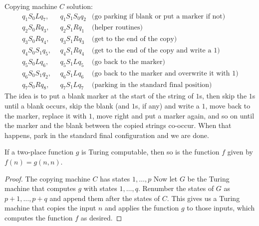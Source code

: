 \begin{exercise}[4.3]
  Copying machine $C$ solution:
  \begin{align*}
    q_1S_0Lq_7,&~~q_1S_1S_0q_2&\text{(go parking if blank or put a marker if not)}\\
    q_2S_0Rq_3,&~~q_2S_1Rq_1&\text{(helper routines)}\\
    q_3S_0Rq_4,&~~q_3S_1Rq_3&\text{(get to the end of the copy)}\\
    q_4S_0S_1q_5,&~~q_4S_1Rq_4&\text{(get to the end of the copy and write a $1$)}\\
    q_5S_0Lq_6,&~~q_5S_1Lq_5&\text{(go back to the marker)}\\
    q_6S_0S_1q_2,&~~q_6S_1Lq_6&\text{(go back to the marker and overwrite it with $1$)}\\
    q_7S_0Rq_8,&~~q_7S_1Lq_7&\text{(parking in the standard final position)}
  \end{align*}
  The idea is to put a blank marker at the start of the string of $1$s, then skip the $1$s until a blank occurs, skip the blank (and $1$s, if any) and write a $1$, move back to the marker, replace it with $1$, move right and put a marker again, and so on until the marker and the blank between the copied strings co-occur.
  When that happens, park in the standard final configuration and we are done.
\end{exercise}

\begin{exercise}[4.4]
  If a two-place function $g$ is Turing computable, then so is the function $f$ given by $f(n) = g(n,n)$.
\end{exercise}
\begin{proof}
  The copying machine $C$ has states $1,\ldots,p$
  Now let $G$ be the Turing machine that computes $g$ with states $1,\ldots,q$.
  Renumber the states of $G$ as $p+1,\ldots,p+q$ and append them after the states of $C$.
  This gives us a Turing machine that copies the input $n$ and applies the function $g$ to those inputs, which computes the function $f$ as desired.
\end{proof}

